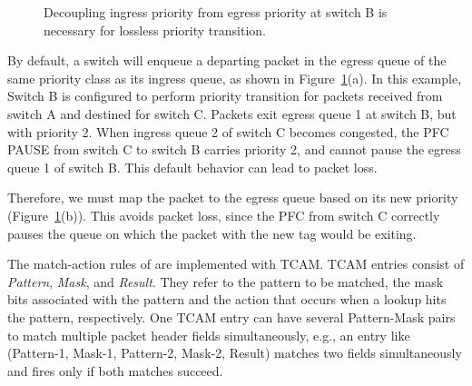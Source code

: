 \begin{figure}[t]
 	\centering
  
 	\caption{Decoupling ingress priority from egress priority at switch B is necessary for lossless priority transition.}\label{fig:prioritydecoupling}
\end{figure}

By default, a switch will enqueue a departing packet in the egress queue
of the same priority class as its ingress queue, as shown in Figure~\ref{fig:prioritydecoupling}(a).
In this example, Switch B is configured to 
perform priority transition for packets received from switch A and destined for switch C.
Packets exit egress queue 1 at switch B, but with priority 2. 
When ingress queue 2 of switch C becomes congested, the PFC PAUSE from switch C 
to switch B carries priority 2, and cannot pause the egress queue 1 of switch B.
This default behavior can lead to packet loss.

Therefore, we must map the packet to the egress queue
based on its new priority (Figure~\ref{fig:prioritydecoupling}(b)).  
This avoids packet loss, since the PFC from switch C
correctly pauses the queue on which the packet with the new tag would be
exiting.

  The match-action rules of \sysname{}
are implemented with TCAM. TCAM entries consist of {\em Pattern},
{\em Mask}, and {\em Result}. They refer to the pattern to be matched, the mask bits 
associated with the pattern and the action that occurs when a lookup hits the pattern, 
respectively.  One TCAM entry can have several Pattern-Mask pairs to match multiple packet header fields
simultaneously, e.g., an entry like (Pattern-1, Mask-1, Pattern-2, Mask-2, Result)
matches two fields simultaneously and fires only if both matches succeed.

